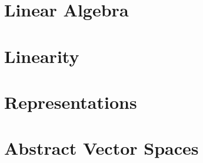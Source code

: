 \section{Linear Algebra}
\section{Linearity}
\section{Representations}
\section{Abstract Vector Spaces}
